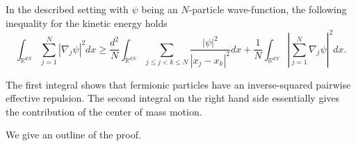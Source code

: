 \begin{theorem}
  In the described setting with $\psi$ being an $N$-particle wave-function, the following inequality for the kinetic energy holds
  \begin{equation}\label{eq:fermion ineq}
    \int_{\mathbb{R}^{dN}} \sum_{j=1}^N |\nabla_j \psi|^2 dx \ge
    \frac{d^2}{N} \int_{\mathbb{R}^{dN}} \sum_{j \le j < k \le N} \frac{|\psi|^2}{|x_j-x_k|^2} dx +
    \frac{1}{N} \int_{\mathbb{R}^{dN}} \left|\sum_{j=1}^N \nabla_j \psi \right|^2 dx.
  \end{equation}
\end{theorem}

The first integral shows that fermionic particles have an inverse-squared pairwise effective repulsion. The second integral on the right hand side essentially gives the contribution of the center of mass motion.

We give an outline of the proof.

